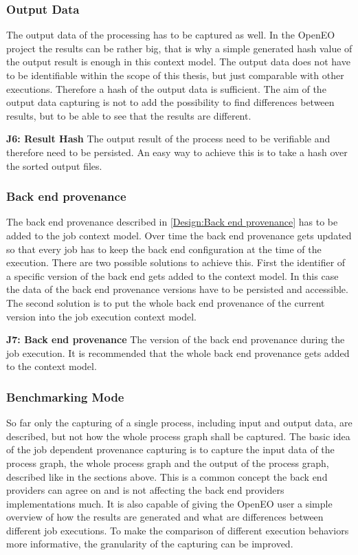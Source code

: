 \documentclass[draft,final]{vutinfth} %
\begin{document}
\subsubsection{Output Data}\label{Job:Output Data}
The output data of the processing has to be captured as well. In the OpenEO project the results can be rather big, that is why a simple generated hash value of the output result is enough in this context model. The output data does not have to be identifiable within the scope of this thesis, but just comparable with other executions. Therefore a hash of the output data is sufficient. The aim of the output data capturing is not to add the possibility to find differences between results, but to be able to see that the results are different. 

\textbf{J6: Result Hash}
The output result of the process need to be verifiable and therefore need to be persisted. An easy way to achieve this is to take a hash over the sorted output files. 

\subsubsection{Back end provenance}\label{Job:Back end provenance}
The back end provenance described in \ref{Design:Back end provenance} has to be added to the job context model. Over time the back end provenance gets updated so that every job has to keep the back end configuration at the time of the execution. There are two possible solutions to achieve this. First the  identifier of a specific version of the back end gets added to the context model. In this case the data of the back end provenance versions have to be persisted and accessible. The second solution is to put the whole back end provenance of the current version into the job execution context model.

\textbf{J7: Back end provenance} 
The version of the back end provenance during the job execution. It is recommended that  the whole back end provenance gets added to the context model.

\subsubsection{Benchmarking Mode}\label{Job:Benchmarking}

So far only the capturing of a single process, including input and output data, are described, but not how the whole process graph shall be captured. The basic idea of the job dependent provenance capturing is to capture the input data of the process graph, the whole process graph and the output of the process graph, described like in the sections above. This is a common concept the back end providers can agree on and is not affecting the back end providers implementations much. It is also capable of giving the OpenEO user a simple overview of how the results are generated and what are differences between different job executions. 
To make the comparison of different execution behaviors more informative, the granularity of the capturing can be improved. 
\end{document}
